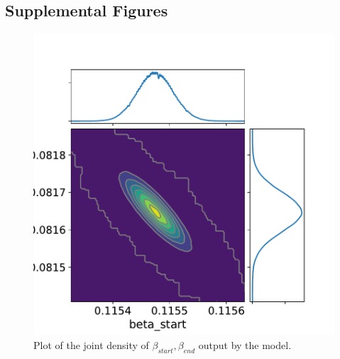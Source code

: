 \documentclass[11pt]{article}
\begin{document}
\subsection{Supplemental Figures}
    \begin{figure}
        \centering
        \includegraphics[scale=0.75]{model_joint_betas}
        \caption{Plot of the joint density of $\beta_{start},\beta_{end}$ output by the model.}
        \label{model_joint_betas}
    \end{figure}
\end{document}
